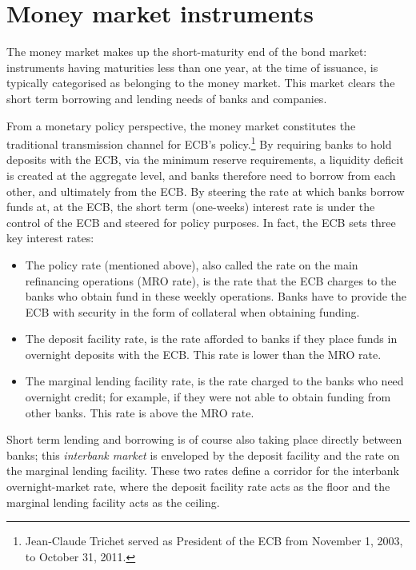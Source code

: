 \documentclass[
  letterpaper,
  DIV=11,
  numbers=noendperiod]{scrreprt}
\providecommand{\tightlist}{%
  \setlength{\itemsep}{0pt}\setlength{\parskip}{0pt}}
\begin{document}
\section*{Money market instruments}\label{money-market-instruments}


The money market makes up the short-maturity end of the bond market:
instruments having maturities less than one year, at the time of
issuance, is typically categorised as belonging to the money market.
This market clears the short term borrowing and lending needs of banks
and companies.

From a monetary policy perspective, the money market constitutes the
traditional transmission channel for ECB's policy.\footnote{Jean‑Claude
  Trichet served as President of the ECB from November 1, 2003, to
  October 31, 2011.} By requiring banks to hold deposits with the ECB,
via the minimum reserve requirements, a liquidity deficit is created at
the aggregate level, and banks therefore need to borrow from each other,
and ultimately from the ECB. By steering the rate at which banks borrow
funds at, at the ECB, the short term (one-weeks) interest rate is under
the control of the ECB and steered for policy purposes. In fact, the ECB
sets three key interest rates:

\begin{itemize}
\tightlist
\item
  The policy rate (mentioned above), also called the rate on the main
  refinancing operations (MRO rate), is the rate that the ECB charges to
  the banks who obtain fund in these weekly operations. Banks have to
  provide the ECB with security in the form of collateral when obtaining
  funding.
\item
  The deposit facility rate, is the rate afforded to banks if they place
  funds in overnight deposits with the ECB. This rate is lower than the
  MRO rate.
\item
  The marginal lending facility rate, is the rate charged to the banks
  who need overnight credit; for example, if they were not able to
  obtain funding from other banks. This rate is above the MRO rate.
\end{itemize}

Short term lending and borrowing is of course also taking place directly
between banks; this \emph{interbank market} is enveloped by the deposit
facility and the rate on the marginal lending facility. These two rates
define a corridor for the interbank overnight-market rate, where the
deposit facility rate acts as the floor and the marginal lending
facility acts as the ceiling.
\end{document}
